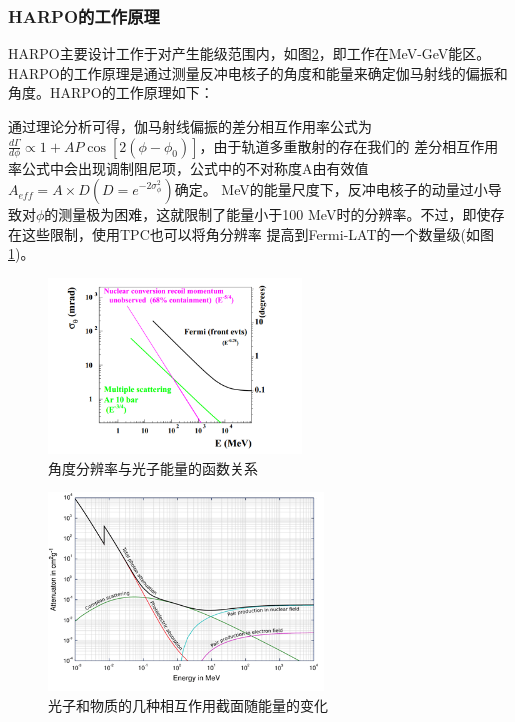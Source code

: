 \subsubsection{HARPO的工作原理}
		HARPO主要设计工作于对产生能级范围内，如图\ref{fig:energy level}，即工作在MeV-GeV能区。HARPO的工作原理是通过测量反冲电核子的角度和能量来确定伽马射线的偏振和角度。HARPO的工作原理如下：

		通过理论分析可得，伽马射线偏振的差分相互作用率公式为$\frac{d \Gamma}{d \phi} \propto 1+AP \cos [2(\phi-\phi_0)]$，由于轨道多重散射的存在我们的
		差分相互作用率公式中会出现调制阻尼项，公式中的不对称度A由有效值$A_{eff}= A\times D(D=e^{-2\sigma^2_{\phi}})$确定。
		MeV的能量尺度下，反冲电核子的动量过小导致对$\phi$的测量极为困难，这就限制了能量小于100 MeV时的分辨率。不过，即使存在这些限制，使用TPC也可以将角分辨率
		提高到Fermi-LAT的一个数量级(如图\ref{fig:angularresolution of HA})。
		\begin{figure}[H]
			\centering
			\includegraphics[width=0.6\textwidth]{figures/角度分辨率HA.png}
			\caption{角度分辨率与光子能量的函数关系} \label{fig:angularresolution of HA}
		\end{figure}
		\begin{figure}[H]
			\centering
			\includegraphics[width=0.65\textwidth]{figures/各能区主要反应.png}
			\caption{光子和物质的几种相互作用截面随能量的变化} \label{fig:energy level}
		\end{figure}

